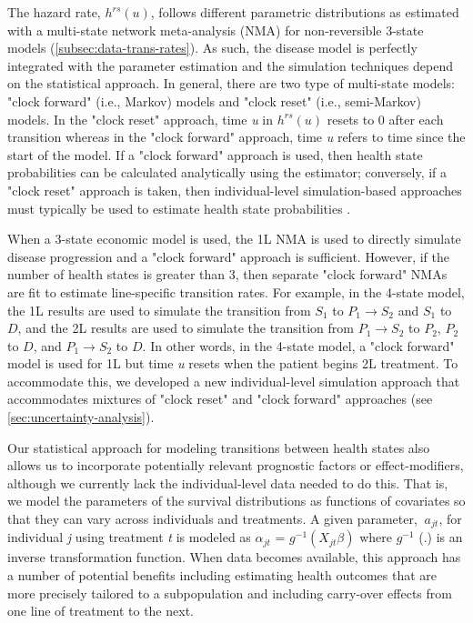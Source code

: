 \documentclass[11pt,final,fleqn]{article}\usepackage[]{graphicx}\usepackage[]{color}
\theoremstyle{plain}
\begin{document}
{The hazard rate, $h^{rs}(u)$, follows different parametric distributions as estimated with a multi-state network meta-analysis (NMA) for non-reversible 3-state models (\autoref{subsec:data-trans-rates}). As such, the disease model is perfectly integrated with the parameter estimation and the simulation techniques  depend on the statistical approach. In general, there are two type of multi-state models: "clock forward" (i.e., Markov) models and "clock reset" (i.e., semi-Markov) models. In the "clock reset" approach, time \textit{u} in $h^{rs}(u)$ resets to 0 after each transition whereas in the "clock forward" approach, time \textit{u} refers to time since the start of the model. If a "clock forward" approach is used, then health state probabilities can be calculated analytically using the \citet{aalen1978empirical} estimator; conversely, if a "clock reset" approach is taken, then individual-level simulation-based approaches must typically be used to estimate health state probabilities \citep{putter2007tutorial, de2011mstate, jackson2016flexsurv}. 

When a 3-state economic model is used, the 1L NMA is used to directly simulate disease progression and a "clock forward" approach is sufficient. However, if the number of health states is greater than $3$, then separate "clock forward" NMAs are fit to estimate line-specific transition rates. For example, in the 4-state model, the 1L results are used to simulate the transition from $S_1$ to $P_1 \rightarrow S_2$ and $S_1$ to $D$, and the 2L results are used to simulate the transition from $P_1 \rightarrow S_2$ to $P_2$, $P_2$ to $D$, and $P_1 \rightarrow S_2$ to $D$. In other words, in the 4-state model, a "clock forward" model is used for 1L but time \textit{u} resets when the patient begins 2L treatment. To accommodate this, we developed a new individual-level simulation approach that accommodates mixtures of "clock reset" and "clock forward" approaches (see \autoref{sec:uncertainty-analysis}).

Our statistical approach for modeling transitions between health states also allows us to incorporate potentially relevant prognostic factors or effect-modifiers, although we currently lack the individual-level data needed to do this. That is, we model the parameters of the survival distributions as functions of covariates so that they can vary across individuals and treatments. A given parameter, $\ a_{jt} $, for individual \textit{j} using treatment \textit{t} is modeled as $ \alpha_{jt} $ = $ \textit{g}^{-1} (X_{jt}\beta) $ where $ \textit{g}^{-1} $ (.) is an inverse transformation function. When data becomes available, this approach has a number of potential benefits including estimating health outcomes that are more precisely tailored to a subpopulation and including carry-over effects from one line of treatment to the next.


}
\end{document}
